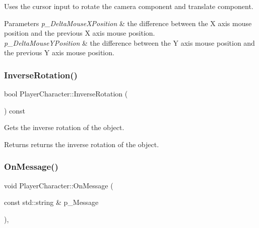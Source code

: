 Uses the cursor input to rotate the camera component and translate component. 


\begin{DoxyParams}{Parameters}
{\em p\+\_\+\+Delta\+Mouse\+X\+Position} & the difference between the X axis mouse position and the previous X axis mouse position. \\
\hline
{\em p\+\_\+\+Delta\+Mouse\+Y\+Position} & the difference between the Y axis mouse position and the previous Y axis mouse position. \\
\hline
\end{DoxyParams}
\mbox{\label{class_player_character_ad399d3e443c27f450d8f7a32054484de}} 
\subsubsection{\texorpdfstring{InverseRotation()}{InverseRotation()}}
{\footnotesize\ttfamily bool Player\+Character\+::\+Inverse\+Rotation (\begin{DoxyParamCaption}{ }\end{DoxyParamCaption}) const\hspace{0.3cm}{\ttfamily [inline]}}



Gets the inverse rotation of the object. 

\begin{DoxyReturn}{Returns}
returns the inverse rotation of the object. 
\end{DoxyReturn}
\mbox{\label{class_player_character_a7185322cbdc51cc339bfcada0c8fdb29}} 
\subsubsection{\texorpdfstring{OnMessage()}{OnMessage()}}
{\footnotesize\ttfamily void Player\+Character\+::\+On\+Message (\begin{DoxyParamCaption}\item[{const std\+::string \&}]{p\+\_\+\+Message }\end{DoxyParamCaption})\hspace{0.3cm}{\ttfamily [override]}, {\ttfamily [virtual]}}



